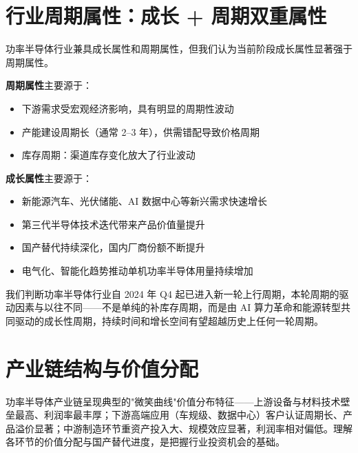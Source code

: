 \section{行业周期属性：成长 + 周期双重属性}

功率半导体行业兼具成长属性和周期属性，但我们认为当前阶段成长属性显著强于周期属性。

\vspace{0.3em}

\textbf{周期属性}主要源于：
\begin{itemize}[leftmargin=2em]
\item 下游需求受宏观经济影响，具有明显的周期性波动
\item 产能建设周期长（通常 2–3 年），供需错配导致价格周期
\item 库存周期：渠道库存变化放大了行业波动
\end{itemize}

\textbf{成长属性}主要源于：
\begin{itemize}[leftmargin=2em]
\item 新能源汽车、光伏储能、AI 数据中心等新兴需求快速增长
\item 第三代半导体技术迭代带来产品价值量提升
\item 国产替代持续深化，国内厂商份额不断提升
\item 电气化、智能化趋势推动单机功率半导体用量持续增加
\end{itemize}

\begin{keyinsight}[周期视角下的行业判断]
我们判断功率半导体行业自 2024 年 Q4 起已进入新一轮上行周期，本轮周期的驱动因素与以往不同——不是单纯的补库存周期，而是由 AI 算力革命和能源转型共同驱动的成长性周期，持续时间和增长空间有望超越历史上任何一轮周期。
\end{keyinsight}

\section{产业链结构与价值分配}

功率半导体产业链呈现典型的"微笑曲线"价值分布特征——上游设备与材料技术壁垒最高、利润率最丰厚；下游高端应用（车规级、数据中心）客户认证周期长、产品溢价显著；中游制造环节重资产投入大、规模效应显著，利润率相对偏低。理解各环节的价值分配与国产替代进度，是把握行业投资机会的基础。

